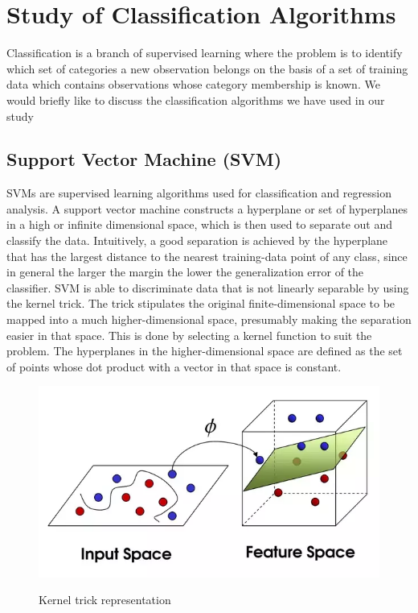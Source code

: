 \chapter{Study of Classification Algorithms} \label{Study of Classification Algorithms}
\noindent Classification is a branch of supervised learning where the problem is to identify which set of categories a new observation belongs on the basis of a set of training data which contains observations whose category membership is known. We would briefly like to discuss the classification algorithms we have used in our study


\section{ Support Vector Machine (SVM)} \label{ Support Vector Machine (SVM)}
\noindent SVMs are supervised learning algorithms used for classification and regression analysis. A support vector machine constructs a hyperplane or set of hyperplanes in a high or infinite dimensional space, which is then used to separate out and classify the data. Intuitively, a good separation is achieved by the hyperplane that has the largest distance to the nearest training-data point of any class, since in general the larger the margin the lower the generalization error of the classifier. SVM is able to discriminate data that is not linearly separable by using the kernel trick. 
\noindent The trick stipulates the original finite-dimensional space to be mapped into a much higher-dimensional space, presumably making the separation easier in that space. This is done by selecting a kernel function to suit the problem. The hyperplanes in the higher-dimensional space are defined as the set of points whose dot product with a vector in that space is constant.

\begin{figure}[H]
\centering
{\includegraphics[scale=0.79]{ktr.png}}
\caption{Kernel trick representation}
\end{figure}


